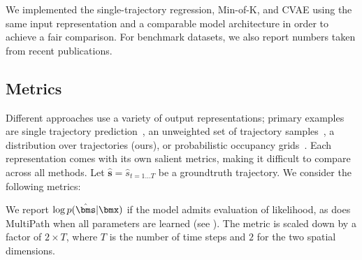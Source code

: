 \documentclass{article}
\newcommand{\out}[1]{}
\newcommand{\multiflow}{MultiPath\xspace}
\begin{document}
We implemented the single-trajectory regression, Min-of-K, and CVAE using the same input representation and a comparable model architecture in order to achieve a fair comparison. For benchmark datasets, we also report numbers taken from recent publications.

\subsection{Metrics}
\label{sec:metrics}

Different approaches use a variety of output representations; primary examples are single trajectory prediction~\cite{Luo18}, an unweighted set of trajectory samples~\cite{Lee17}, a distribution over trajectories (ours), or probabilistic occupancy grids~\cite{Bansal19}. Each representation comes with its own salient metrics, making it difficult to compare across all methods.  Let $\hat{\mathbf{s}} = \hat{s}_{t = 1 \ldots T}$ be a groundtruth trajectory. We consider the following metrics:

 We report $\log p(\hat{\bms}|\bmx)$ if the model admits evaluation of likelihood, as does \multiflow when all parameters are learned (see ). The metric is scaled down by a factor of $2 \times T$, where $T$ is the number of time steps and $2$ for the two spatial dimensions.


\out{The log-likelihood is a concise \TODO{chaiy, how to phrase this better} metric compared to the distance-based metrics which often over-penalizes reasonable trajectories that could have happened but did not in the dataset. However, the log-likelihood is less }

\out{\TODO{Do it if time allows.} For methods that generate one or a few discrete trajectories without estimating covariances, we find a single scalar $\alpha$ to represent variances at all waypoints. We assume independence between and within waypoints. For generative methods where a large number of independent samples can be drawn, we apply kernel-density-estimation (KDE) on the samples to yield a mixture of Gaussian, which in turn estimates the log-likelihood of a groundtruth trajectory. The log-likelihood is our {\em preferred} metric for the ablation. Unfortunately, the log-likelihood approximated via post-processing may suffer from great approximation error and become less comparable. The log-likelihood has the unit in nat.
}
\end{document}
